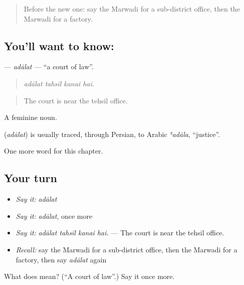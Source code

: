\begin{quote}
Before the new one: say the Marwadi for a sub-district office, then the Marwadi for a factory.
\end{quote}

\subsection*{You'll want to know: }
\textbf{} — \emph{adālat} — \textquotedblleft{}a court of law\textquotedblright{}.

\begin{quote}
   
\end{quote}

\begin{quote}
\emph{adālat tahsīl kanai hai.}
\end{quote}

\begin{quote}
The court is near the tehsil office.
\end{quote}

A feminine noun.

\begin{cousinweb}
\textbf{} (\emph{adālat}) is usually traced, through Persian, to Arabic \emph{ʿadāla}, \textquotedblleft{}justice\textquotedblright{}.
\end{cousinweb}

\begin{grammarlens}[title={What you've built}]
One more word for this chapter.
\end{grammarlens}

\subsection*{Your turn}
\begin{itemize}
\raggedright
  \item \emph{Say it:} \emph{adālat}
  \item \emph{Say it:} \emph{adālat}, once more
  \item \emph{Say it:} \emph{adālat tahsīl kanai hai.} — The court is near the tehsil office.
  \item \emph{Recall:} say the Marwadi for a sub-district office, then the Marwadi for a factory, then say \emph{adālat} again
\end{itemize}

\begin{tcolorbox}[breakable,colback=teal!4,colframe=teal!35!black,title={Before you move on}]
What does  mean? (\textquotedblleft{}A court of law\textquotedblright{}.) Say it once more.
\end{tcolorbox}

